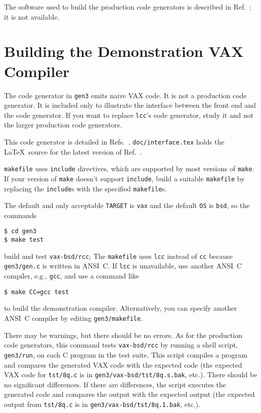The software used to build the production code generators
is described in Ref.~\cite{fraser:sigplan89}; it is not available.

\section{Building the Demonstration VAX Compiler}\label{gen3}

The code generator in \verb|gen3| emits naive VAX code.
It is not a production code generator. It is included only
to illustrate the interface between the front end
and the code generator. If you want to replace \verb|lcc|'s code generator,
study it and not the larger production code generators.

This code generator is detailed in
Refs.~\cite{fraser:hanson:interface:TR,fraser:hanson:91a,fraser:hanson:92}.
\verb|doc/interface.tex| holds the \LaTeX\ source for the latest
version of Ref.~\cite{fraser:hanson:interface:TR}.

\verb|makefile| uses \verb|include| directives, which are supported by
most versions of \verb|make|. If your version of \verb|make|
doesn't support \verb|include|, build a suitable \verb|makefile|
by replacing the \verb|include|s with the specified \verb|makefile|s.

The default and only acceptable \verb|TARGET| is \verb|vax|
and the default \verb|OS| is \verb|bsd|, so the commands
\begin{verbatim}
$ cd gen3
$ make test
\end{verbatim}
build and test \verb|vax-bsd/rcc|;
The \verb|makefile| uses \verb|lcc| instead of \verb|cc|
because \verb|gen3/gen.c| is written in ANSI~C.
If \verb|lcc| is unavailable, use another ANSI~C compiler, e.g., \verb|gcc|,
and use a command like
\begin{verbatim}
$ make CC=gcc test
\end{verbatim}
to build the demonstration compiler. Alternatively, you can specify
another ANSI~C compiler by editing \verb|gen3/makefile|.

There may be warnings, but there should be no errors.
As for the production code generators, this command
tests \verb|vax-bsd/rcc| by running a shell script,
\verb|gen3/run|, on each C program in the test suite.
This script compiles a program and compares the generated VAX code
with the expected code (the expected VAX code for \verb|tst/8q.c| is
in \verb|gen3/vax-bsd/tst/8q.s.bak|, etc.).
There should be no significant differences.
If there are differences, the script executes the generated code
and compares the output with the expected output
(the expected output from \verb|tst/8q.c| is
in \verb|gen3/vax-bsd/tst/8q.1.bak|, etc.).

